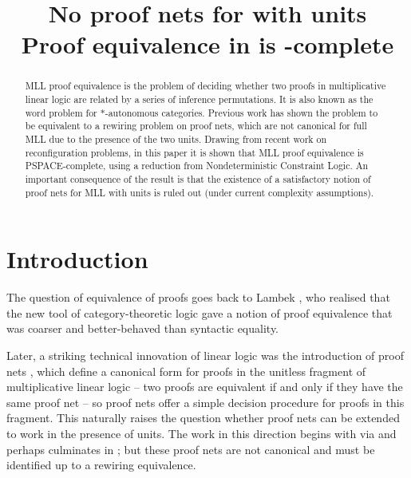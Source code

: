 \documentclass[conference]{IEEEtran}
\author{
  \IEEEauthorblockN{Willem Heijltjes}
  \IEEEauthorblockA{
  		University of Bath
	\\	w.b.heijltjes@bath.ac.uk
	}
\and
  \IEEEauthorblockN{Robin Houston}
  \IEEEauthorblockA{
		Kiln Enterprises
	\\	robin@kiln.it
	}
}
\title{No proof nets for \capsabbrev{mll} with units\\[5pt]\Large Proof equivalence in \capsabbrev{mll} is \capsabbrev{pspace}-complete}
\let\beforesection=\medskip
\let\aftersection=\noindent
\let\capsabbrev=\uppercase
\begin{document}
\maketitle

\begin{abstract}
\capsabbrev{mll} proof equivalence is the problem of deciding whether two proofs in multiplicative linear logic are related by a series of inference permutations.
%
It is also known as the word problem for $*$-autonomous categories.
%
Previous work has shown the problem to be equivalent to a rewiring problem on proof nets, which are not canonical for full \capsabbrev{mll} due to the presence of the two units.
%
Drawing from recent work on reconfiguration problems, in this paper it is shown that \capsabbrev{mll} proof equivalence is \capsabbrev{pspace}-complete, using a reduction from Nondeterministic Constraint Logic.
%
An important consequence of the result is that the existence of a satisfactory notion of proof nets for \capsabbrev{mll} with units is ruled out (under current complexity assumptions).
\end{abstract}


\beforesection

\section{Introduction}

\aftersection
%
The question of equivalence of proofs goes back to Lambek \cite{Lambek-1968}, who realised that the new tool of category-theoretic logic gave a notion of proof equivalence that was coarser and better-behaved than syntactic equality.

Later, a striking technical innovation of linear logic was the introduction of proof nets \cite{Girard-1987,Danos-Regnier-1989}, which define a canonical form for proofs in the unitless fragment of multiplicative linear logic -- two proofs are equivalent if and only if they have the same proof net -- so proof nets offer a simple decision procedure for proofs in this fragment. This naturally raises the question whether proof nets can be extended to work in the presence of units. The work in this direction begins with \cite{Trimble-1994,Blute-Cockett-Seely-Trimble-1996} via \color{red}\cite{Lamarche-Strassburger-2006} \color{black} and perhaps culminates in \cite{HughesFreeStar,HughesMLLProofNets}; but these proof nets are not canonical and must be identified up to a rewiring equivalence.
\end{document}
